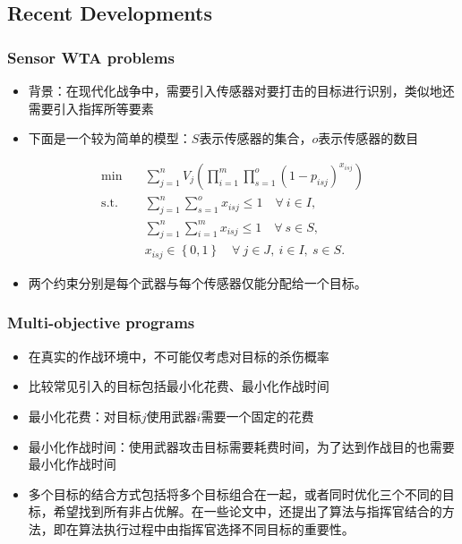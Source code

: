 \documentclass[CJK,10pt]{beamer}
\begin{document}
\subsection{Recent Developments}
\begin{frame}
    \frametitle{Sensor WTA problems}
    \begin{itemize}
        \item 背景：在现代化战争中，需要引入传感器对要打击的目标进行识别，类似地还需要引入指挥所等要素
        \item 下面是一个较为简单的模型：$S$表示传感器的集合，$o$表示传感器的数目
    \end{itemize}
    \begin{align*} \tag{Sensor}
        \min\quad & \sum_{j=1}^n V_j \left( \prod_{i=1}^m {\prod_{s = 1}^{o} (1 -  p_{isj})^{x_{isj}}} \right) \\ 
        \mathrm{s. t.}\quad &\sum_{j=1}^n {\sum_{s=1}^o x_{isj}} \leq 1\quad \forall ~i \in I,\\
        &\sum_{j=1}^n {\sum_{i=1}^m x_{isj}} \leq 1\quad \forall ~s \in S,\\
        & x_{isj} \in \left\{ 0,1 \right\} \quad \forall~ j\in J , ~ i \in I,~ s\in S.
    \end{align*}
    \begin{itemize}
        \item 两个约束分别是每个武器与每个传感器仅能分配给一个目标。
    \end{itemize}
\end{frame}

\begin{frame}
    \frametitle{Multi-objective programs}
    \begin{itemize}
        \item 在真实的作战环境中，不可能仅考虑对目标的杀伤概率
        \item 比较常见引入的目标包括最小化花费、最小化作战时间
        \item 最小化花费：对目标$j$使用武器$i$需要一个固定的花费
        \item 最小化作战时间：使用武器攻击目标需要耗费时间，为了达到作战目的也需要最小化作战时间
        \item 多个目标的结合方式包括将多个目标组合在一起，或者同时优化三个不同的目标，希望找到所有非占优解。在一些论文中，还提出了算法与指挥官结合的方法，即在算法执行过程中由指挥官选择不同目标的重要性。
    \end{itemize}
\end{frame}
\end{document}
